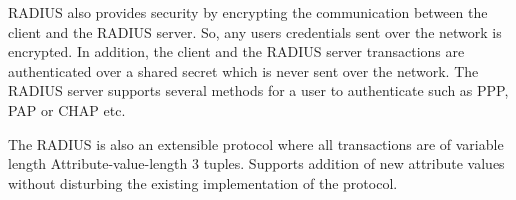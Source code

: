 RADIUS also provides security by encrypting the communication between the client and the RADIUS server. So,  any users credentials sent over the network is encrypted. In addition, the client and the RADIUS server transactions are authenticated over a shared secret which is never sent over the network. The RADIUS server supports several methods for a user to authenticate such as PPP, PAP or CHAP etc.

The RADIUS is also an extensible protocol where all transactions are of variable length Attribute-value-length 3 tuples. Supports addition of new attribute values without disturbing the existing implementation of the protocol.


%	

